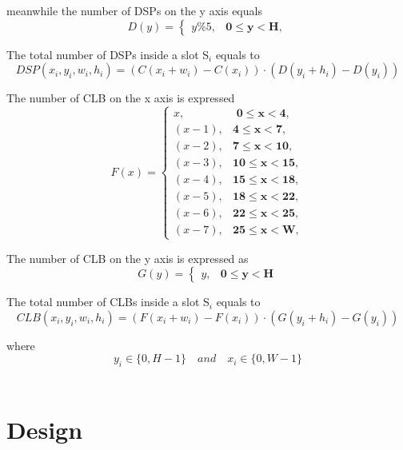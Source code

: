 \documentclass[11pt]{article}
\theoremstyle{definition}
\begin{document}
meanwhile the number of DSPs on the y axis equals 
\begin{equation}
D(y) = \begin{cases} 
y\%5, & \textbf{0$\leq$y$<$H},
\end{cases}
\end{equation}

The total number of DSPs inside a slot S$_i$ equals to \\
\begin{equation}
DSP(x_i,y_i,w_i,h_i) =  (C(x_i+w_i) - C(x_i)) \cdot (D(y_i+h_i) - D(y_i))
\end{equation}					  


The number of CLB on the x axis is expressed 					  
\begin{equation}
F(x) = \begin{cases}
x, & \textbf{ 0$\leq$x$<$4}, \\
(x-1), & \textbf{4$\leq$x$<$7}, \\
(x-2), & \textbf{7$\leq$x$<$10}, \\
(x-3), & \textbf{10$\leq$x$<$15}, \\
(x-4), & \textbf{15$\leq$x$<$18}, \\
(x-5), & \textbf{18$\leq$x$<$22}, \\
(x-6), & \textbf{22$\leq$x$<$25}, \\
(x-7), & \textbf{25$\leq$x$<$W},
\end{cases}
\end{equation}

The number of CLB on the y axis is expressed as 
\begin{equation}
G(y) =  \begin{cases}
y, & \textbf{0$\leq$y$<$H}
\end{cases}
\end{equation}

The total number of CLBs inside a slot S$_i$ equals to \\
\begin{equation}
CLB(x_i,y_i,w_i,h_i) =  (F(x_i+w_i) - F(x_i)) \cdot (G(y_i+h_i) - G(y_i))
\end{equation}					  
			  
					  
\hspace{15mm} where \[y_i\in \{0, H-1 \}  \quad and \quad x_i\in \{0, W-1 \} \] \\

\section{Design}
\end{document}
